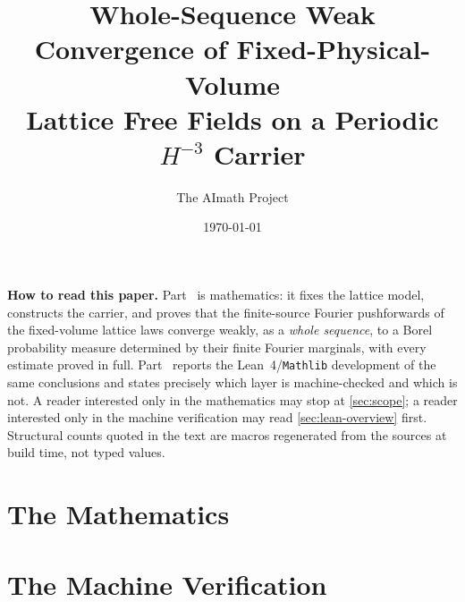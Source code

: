\documentclass[11pt]{amsart}
\title[Fixed-volume lattice free fields and their H$^{-3}$ weak limit]
       {Whole-Sequence Weak Convergence of Fixed-Physical-Volume\\ Lattice Free
        Fields on a Periodic $H^{-3}$ Carrier}
\author{The AImath Project}
\date{\today}
\theoremstyle{plain}
\theoremstyle{definition}
\theoremstyle{remark}
\begin{document}
\begin{abstract}

\end{abstract}

\maketitle

\pagestyle{plain}

\tableofcontents

\bigskip

\noindent\textbf{How to read this paper.}  Part~\ref{part:math} is mathematics:
it fixes the lattice model, constructs the carrier, and proves that the
finite-source Fourier pushforwards of the fixed-volume lattice laws converge
weakly, as a \emph{whole sequence}, to a Borel probability measure determined by
their finite Fourier marginals, with every estimate proved in full.
Part~\ref{part:lean} reports the Lean~4/\texttt{Mathlib} development of the
same conclusions and states precisely which layer is machine-checked and which
is not.  A reader interested only in the mathematics may stop at
\cref{sec:scope}; a reader interested only in the machine verification may read
\cref{sec:lean-overview} first.  Structural counts quoted in the text are
macros regenerated from the sources at build time, not typed values.

\part{The Mathematics}\label{part:math}












\part{The Machine Verification}\label{part:lean}
\end{document}
